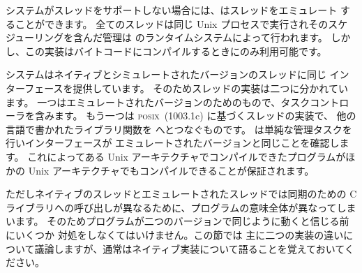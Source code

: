 システムがスレッドをサポートしない場合には、\ocaml はスレッドをエミュレート
することができます。
全てのスレッドは同じ Unix プロセスで実行されそのスケジューリングを含んだ管理は
\ocaml のランタイムシステムによって行われます。
しかし、この実装はバイトコードにコンパイルするときにのみ利用可能です。

\ocaml システムはネイティブとシミュレートされたバージョンのスレッドに同じ
インターフェースを提供しています。
そのためスレッドの実装は二つに分かれています。
一つはエミュレートされたバージョンのためのもので、タスクコントローラを含みます。
もう一つは \textsc{posix}~(1003.1c) に基づくスレッドの実装で、
他の言語で書かれたライブラリ関数を \ocaml へとつなぐものです。
\ocaml は単純な管理タスクを行いインターフェースが
エミュレートされたバージョンと同じことを確認します。
これによってある Unix アーキテクチャでコンパイルできたプログラムがほかの
Unix アーキテクチャでもコンパイルできることが保証されます。

ただしネイティブのスレッドとエミュレートされたスレッドでは同期のための
C ライブラリへの呼び出しが異なるために、プログラムの意味全体が異なってしまいます。
そのためプログラムが二つのバージョンで同じように動くと信じる前にいくつか
対処をしなくてはいけません。この節では
主に二つの実装の違いについて議論しますが、通常はネイティブ実装について語ることを覚えておいてください。

